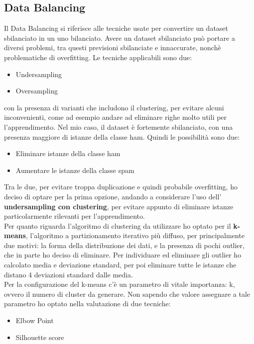 \documentclass[]{article}
\begin{document}
        \subsection{Data Balancing}
            Il Data Balancing si riferisce alle tecniche usate per convertire un dataset sbilanciato in un uno bilanciato. Avere un dataset sbilanciato può portare a diversi problemi, tra questi previsioni sbilanciate e innaccurate, nonchè problematiche di overfitting.
            Le tecniche applicabili sono due:
            \begin{itemize}
                \item Undersampling
                \item Oversampling
            \end{itemize}
            con la presenza di varianti che includono il clustering, per evitare alcuni inconvenienti, come ad esempio andare ad eliminare righe molto utili per l'apprendimento. Nel mio caso, il dataset è fortemente sbilanciato, con una presenza maggiore di istanze della classe ham. Quindi le possibilità sono due:
            \begin{itemize}
                \item Eliminare istanze della classe ham
                \item Aumentare le istanze della classe spam
            \end{itemize}
            Tra le due, per evitare troppa duplicazione e quindi probabile overfitting, ho deciso di optare per la prima opzione, andando a considerare l'uso dell' \textbf{undersampling con clustering}, per evitare appunto di eliminare istanze particolarmente rilevanti per l'apprendimento.\\
            Per quanto riguarda l'algoritmo di clustering \cite{KMeansClustering} da utilizzare ho optato per il \textbf{k-means}, l'algoritmo a partizionamento iterativo più diffuso, per principalmente due motivi: la forma della distribuzione dei dati, e la presenza di pochi outlier, che in parte ho deciso di eliminare. Per individuare ed eliminare gli outlier ho calcolato media e deviazione standard, per poi eliminare tutte le istanze che distano 4 deviazioni standard dalle media.\\
            Per la configurazione del k-means c'è un parametro di vitale importanza: k, ovvero il numero di cluster da generare. Non sapendo che valore assegnare a tale parametro ho optato nella valutazione di due tecniche:
            \begin{itemize}
                \item Elbow Point
                \item Silhouette score
            \end{itemize}
\end{document}
